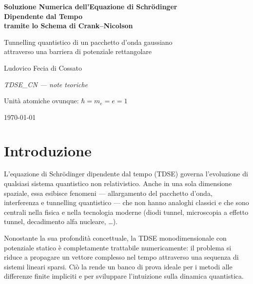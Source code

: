 \documentclass[12pt, a4paper]{article}
\begin{document}
\begin{titlepage}
  \centering
  \vspace*{3cm}
  {\LARGE\bfseries Soluzione Numerica dell'Equazione di Schr\"{o}dinger\\[6pt]
   Dipendente dal Tempo\\[4pt]
   tramite lo Schema di Crank--Nicolson\par}
  \vspace{1.5cm}
  {\large Tunnelling quantistico di un pacchetto d'onda gaussiano\\
   attraverso una barriera di potenziale rettangolare\par}
  \vspace{2cm}
  {\large Ludovico Fecia di Cossato\par}
  \vfill
  {\large\itshape TDSE\_CN — note teoriche\par}
  \vspace{0.5cm}
  {\normalsize Unità atomiche ovunque: $\hbar = m_e = e = 1$\par}
  \vspace{1cm}
  {\normalsize \today\par}
\end{titlepage}

\tableofcontents
\newpage

\section{Introduzione}

L'equazione di Schr\"{o}dinger dipendente dal tempo (TDSE) governa
l'evoluzione di qualsiasi sistema quantistico non relativistico.
Anche in una sola dimensione spaziale, essa esibisce fenomeni ---
allargamento del pacchetto d'onda, interferenza e tunnelling quantistico
--- che non hanno analoghi classici e che sono centrali nella fisica e
nella tecnologia moderne (diodi tunnel, microscopia a effetto tunnel,
decadimento alfa nucleare, \ldots).

Nonostante la sua profondità concettuale, la TDSE monodimensionale
con potenziale statico è completamente trattabile numericamente: il
problema si riduce a propagare un vettore complesso nel tempo attraverso
una sequenza di sistemi lineari sparsi.  Ciò la rende un banco di prova
ideale per i metodi alle differenze finite impliciti e per sviluppare
l'intuizione sulla dinamica quantistica.
\end{document}
